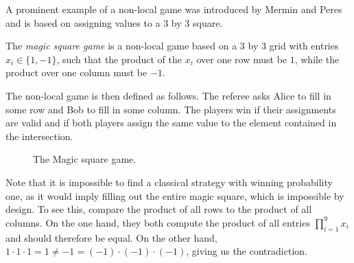 A prominent example of a non-local game was introduced by Mermin and Peres~\cite{PhysRevLett.65.3373}
and is based on assigning values to a 3 by 3 square.
\begin{definition}
    The \emph{magic square game} is a non-local game based on a 3 by 3 grid with entries $x_i \in \{1, -1\}$,
    such that the product of the $x_i$ over one row must be $1$, while the product over one column must be $-1$.

    The non-local game is then defined as follows.
    The referee asks Alice to fill in some row and Bob to fill in some column.
    The players win if their assignments are valid and if both players assign the same value to
    the element contained in the intersection.  
\end{definition}
\begin{figure}[h]
    \centering
    \caption{The Magic square game.}\label{fig:magic-square}
\end{figure}

Note that it is impossible to find a classical strategy with winning probability one, as it 
would imply filling out the entire magic square, which is impossible by design.
To see this, compare the product of all rows to the product of all columns.
On the one hand, they both compute the product of all entries $\prod_{i = 1}^{9} x_i$ and should
therefore be equal. On the other hand, $1\cdot 1 \cdot 1 = 1 \neq -1 = (-1) \cdot (-1) \cdot (-1)$,
giving us the contradiction.


